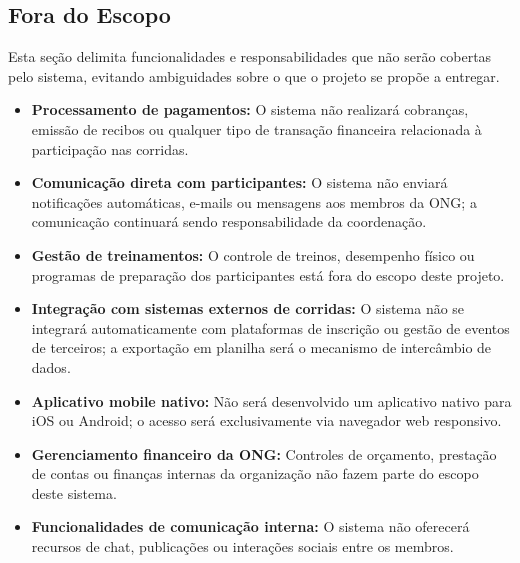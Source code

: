 \documentclass[12pt,a4paper]{article}
\begin{document}
\subsection{Fora do Escopo}

Esta seção delimita funcionalidades e responsabilidades que não serão cobertas pelo
sistema, evitando ambiguidades sobre o que o projeto se propõe a entregar.

\begin{itemize}

    \item \textbf{Processamento de pagamentos:} O sistema não realizará cobranças,
    emissão de recibos ou qualquer tipo de transação financeira relacionada à
    participação nas corridas.

    \item \textbf{Comunicação direta com participantes:} O sistema não enviará
    notificações automáticas, e-mails ou mensagens aos membros da ONG; a comunicação
    continuará sendo responsabilidade da coordenação.

    \item \textbf{Gestão de treinamentos:} O controle de treinos, desempenho físico ou
    programas de preparação dos participantes está fora do escopo deste projeto.

    \item \textbf{Integração com sistemas externos de corridas:} O sistema não se
    integrará automaticamente com plataformas de inscrição ou gestão de eventos de
    terceiros; a exportação em planilha será o mecanismo de intercâmbio de dados.

    \item \textbf{Aplicativo mobile nativo:} Não será desenvolvido um aplicativo nativo
    para iOS ou Android; o acesso será exclusivamente via navegador web responsivo.

    \item \textbf{Gerenciamento financeiro da ONG:} Controles de orçamento, prestação
    de contas ou finanças internas da organização não fazem parte do escopo deste
    sistema.

    \item \textbf{Funcionalidades de comunicação interna:} O sistema não oferecerá
    recursos de chat, publicações ou interações sociais entre os membros.

\end{itemize}
\end{document}
